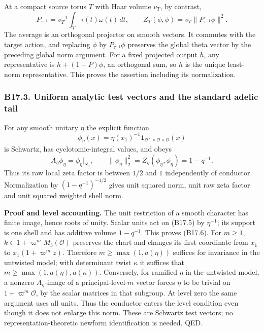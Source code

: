 At a compact source torus \(T\) with Haar volume \(v_T\), by contrast, \[
 P_{\tau^{-1}}=v_T^{-1}\int_T\tau(t)\omega(t)\,dt,
 \qquad Z_T(\phi,\phi)=v_T\|P_{\tau^{-1}}\phi\|^2.
\tag{B17.4}
\] The average is an orthogonal projector on smooth vectors. It commutes with the target action, and replacing \(\phi\) by \(P_{\tau^{-1}}\phi\) preserves the global theta vector by the preceding global norm argument. For a fixed projected output \(h\), any representative is \(h+(1-P)\phi\), an orthogonal sum, so \(h\) is the unique least-norm representative. This proves the assertion including its normalization.

\subsubsection{B17.3. Uniform analytic test vectors and the standard adelic tail}\label{b17.3.-uniform-analytic-test-vectors-and-the-standard-adelic-tail}

For any smooth unitary \(\eta\) the explicit function \[
 \phi_\eta(x)=\eta(x_1)^{-1}
       \mathbf1_{\mathcal O^\times\times\mathcal O\times\mathcal O}(x)
\tag{B17.5}
\] is Schwartz, has cyclotomic-integral values, and obeys \[
 A_\eta\phi_\eta=\phi_\eta|_{S_0},\qquad
 \|\phi_\eta\|_2^2=Z_\eta(\phi_\eta,\phi_\eta)=1-q^{-1}.
\tag{B17.6}
\] Thus its raw local zeta factor is between \(1/2\) and \(1\) independently of conductor. Normalization by \((1-q^{-1})^{-1/2}\) gives unit squared norm, unit raw zeta factor and unit squared weighted shell norm.

\textbf{Proof and level accounting.} The unit restriction of a smooth character has finite image, hence roots of unity. Scalar units act on (B17.5) by \(\eta^{-1}\); its support is one shell and has additive volume \(1-q^{-1}\). This proves (B17.6). For \(m\ge1\), \(k\in1+\varpi^mM_3(\mathcal O)\) preserves the chart and changes its first coordinate from \(x_1\) to \(x_1(1+\varpi^m z)\). Therefore \(m\ge\max(1,a(\eta))\) suffices for invariance in the untwisted model; with determinant twist \(\kappa\) it suffices that \(m\ge\max(1,a(\eta),a(\kappa))\). Conversely, for ramified \(\eta\) in the untwisted model, a nonzero \(A_\eta\)-image of a principal-level-\(m\) vector forces \(\eta\) to be trivial on \(1+\varpi^m\mathcal O\), by the scalar matrices in that subgroup. At level zero the same argument uses all units. Thus the conductor enters the level condition even though it does not enlarge this norm. These are Schwartz test vectors; no representation-theoretic newform identification is needed. QED.

